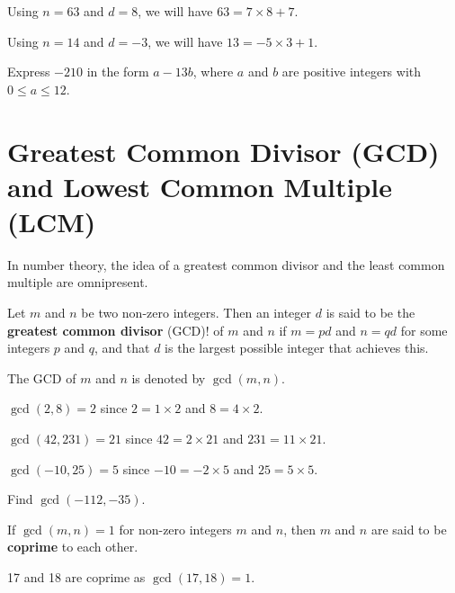 \begin{example}
    Using $n = 63$ and $d = 8$, we will have $63 = 7\times8 + 7$.
\end{example}
\begin{example}
    Using $n = 14$ and $d = -3$, we will have $13 = -5\times3 + 1$.
\end{example}

\begin{exercise}
    Express $-210$ in the form $a-13b$, where $a$ and $b$ are positive integers with $0 \leq a \leq 12$.
\end{exercise}

\section{Greatest Common Divisor (GCD) and Lowest Common Multiple (LCM)}
In number theory, the idea of a greatest common divisor and the least common multiple are omnipresent.

\begin{definition}
    Let $m$ and $n$ be two non-zero integers. Then an integer $d$ is said to be the \textbf{greatest common divisor} (GCD)! of $m$ and $n$ if $m = pd$ and $n = qd$ for some integers $p$ and $q$, and that $d$ is the largest possible integer that achieves this.
\end{definition}
The GCD of $m$ and $n$ is denoted by $\gcd(m, n)$.

\begin{example}
    $\gcd(2, 8) = 2$ since $2 = 1 \times 2$ and $8 = 4 \times 2$.
\end{example}
\begin{example}
    $\gcd(42, 231) = 21$ since $42 = 2 \times 21$ and $231 = 11 \times 21$.
\end{example}
\begin{example}
    $\gcd(-10, 25) = 5$ since $-10 = -2 \times 5$ and $25 = 5 \times 5$.
\end{example}
\begin{exercise}
    Find $\gcd(-112, -35)$.
\end{exercise}

\begin{remark}
    If $\gcd(m, n) = 1$ for non-zero integers $m$ and $n$, then $m$ and $n$ are said to be \textbf{coprime} to each other.
\end{remark}
\begin{example}
    17 and 18 are coprime as $\gcd(17, 18) = 1$.
\end{example}

